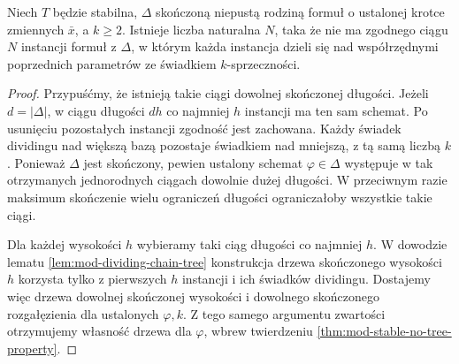 \begin{wniosek}
\label{cor:mod-finite-dividing-chain-bound}
Niech $T$ będzie stabilna, $\Delta$ skończoną
niepustą rodziną formuł o ustalonej krotce
zmiennych $\bar x$, a $k\geq2$.
Istnieje liczba naturalna $N$, taka że
nie ma zgodnego ciągu $N$ instancji
formuł z $\Delta$, w którym każda instancja
dzieli się nad współrzędnymi poprzednich
parametrów ze świadkiem $k$-sprzeczności.
\end{wniosek}
\begin{proof}
Przypuśćmy, że istnieją takie ciągi
dowolnej skończonej długości.
Jeżeli $d=|\Delta|$, w ciągu długości $dh$
co najmniej $h$ instancji ma ten sam schemat.
Po usunięciu pozostałych instancji
zgodność jest zachowana. Każdy świadek
dividingu nad większą bazą pozostaje
świadkiem nad mniejszą, z tą samą liczbą $k$.
Ponieważ $\Delta$ jest skończony, pewien
ustalony schemat $\varphi\in\Delta$ występuje
w tak otrzymanych jednorodnych ciągach
dowolnie dużej długości. W przeciwnym razie
maksimum skończenie wielu ograniczeń długości
ograniczałoby wszystkie takie ciągi.

Dla każdej wysokości $h$ wybieramy taki
ciąg długości co najmniej $h$. W dowodzie
lematu \ref{lem:mod-dividing-chain-tree}
konstrukcja drzewa skończonego wysokości $h$
korzysta tylko z pierwszych $h$ instancji
i ich świadków dividingu. Dostajemy więc
drzewa dowolnej skończonej wysokości
i dowolnego skończonego rozgałęzienia
dla ustalonych $\varphi,k$.
Z tego samego argumentu zwartości
otrzymujemy własność drzewa dla $\varphi$,
wbrew twierdzeniu
\ref{thm:mod-stable-no-tree-property}.
\end{proof}


